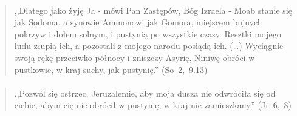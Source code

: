 \documentclass[10pt,a4paper,oneside]{article}
\begin{document}
\paragraph{}
\begin{quote}
,,Dlatego jako żyję Ja - mówi Pan Zastępów, Bóg Izraela - Moab stanie się jak Sodoma, a synowie Ammonowi jak Gomora, miejscem bujnych pokrzyw i dołem solnym, i pustynią po wszystkie czasy. Resztki mojego ludu złupią ich, a pozostali z mojego narodu posiądą ich. (\ldots) Wyciągnie swoją rękę przeciwko północy i zniszczy Asyrię, Niniwę obróci w pustkowie, w kraj suchy, jak pustynię.'' \mbox{(So 2, 9.13)}
\end{quote}
\paragraph{}
\begin{quote}
,,Pozwól się ostrzec, Jeruzalemie, aby moja dusza nie odwróciła się od ciebie, abym cię nie obrócił w pustynię, w kraj nie zamieszkany.'' \mbox{(Jr 6, 8)}
\end{quote}
\end{document}
